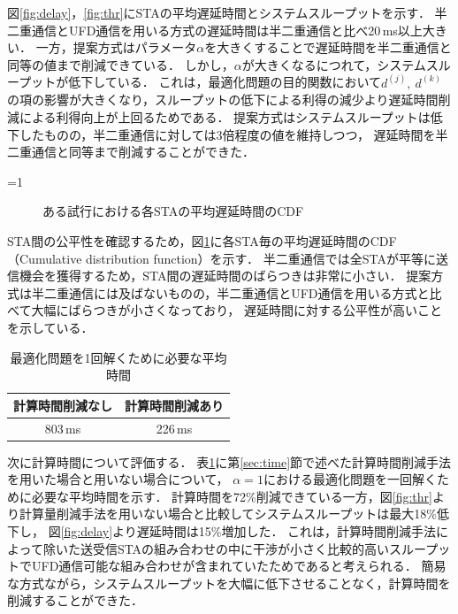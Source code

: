 \documentclass[master]{kuisthesis}		%
\newcounter{flagFig}
\begin{document}
			\par
			図\ref{fig:delay}，\ref{fig:thr}にSTAの平均遅延時間とシステムスループットを示す．
			半二重通信とUFD通信を用いる方式の遅延時間は半二重通信と比べ20\,ms以上大きい．
			一方，提案方式はパラメータ$\alpha$を大きくすることで遅延時間を半二重通信と同等の値まで削減できている．
			しかし，$\alpha$が大きくなるにつれて，システムスループットが低下している．
			これは，最適化問題の目的関数において$d^{(j)},\ d^{(k)}$の項の影響が大きくなり，スループットの低下による利得の減少より遅延時間削減による利得向上が上回るためである．
			提案方式はシステムスループットは低下したものの，半二重通信に対しては3倍程度の値を維持しつつ，
			遅延時間を半二重通信と同等まで削減することができた．
			\par
			\ifnum\value{flagFig}=1 {\begin{figure}[htbp]
				\centering
				\caption{ある試行における各STAの平均遅延時間のCDF}
				\label{fig:cdf}
			\end{figure}}\fi
			STA間の公平性を確認するため，図\ref{fig:cdf}に各STA毎の平均遅延時間のCDF（Cumulative distribution function）を示す．
			半二重通信では全STAが平等に送信機会を獲得するため，STA間の遅延時間のばらつきは非常に小さい．
			提案方式は半二重通信には及ばないものの，半二重通信とUFD通信を用いる方式と比べて大幅にばらつきが小さくなっており，
			遅延時間に対する公平性が高いことを示している．



			\par
			\begin{table}[htbp]
				\centering
				\caption{最適化問題を1回解くために必要な平均時間}
				\label{tab:time}
				\begin{tabular}{cc}
			 	計算時間削減なし & 計算時間削減あり\\ \hline
				803\,ms & 226\,ms \\\hline
				\end{tabular}
			\end{table}
			次に計算時間について評価する．
			表\ref{tab:time}に第\ref{sec:time}節で述べた計算時間削減手法を用いた場合と用いない場合について，
			$\alpha=1$における最適化問題を一回解くために必要な平均時間を示す．
			計算時間を72\%削減できている一方，図\ref{fig:thr}より計算量削減手法を用いない場合と比較してシステムスループットは最大18\%低下し，
			図\ref{fig:delay}より遅延時間は15\%増加した．
			これは，計算時間削減手法によって除いた送受信STAの組み合わせの中に干渉が小さく比較的高いスループットでUFD通信可能な組み合わせが含まれていたためであると考えられる．
			簡易な方式ながら，システムスループットを大幅に低下させることなく，計算時間を削減することができた．
\end{document}
